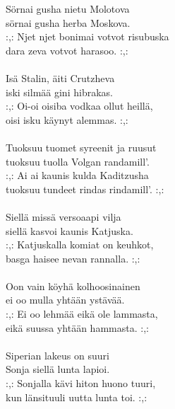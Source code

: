 
            Sörnai gusha nietu Molotova \\
            sörnai gusha herba Moskova. \\
            :,: Njet njet bonimai votvot risubuska \\
            dara zeva votvot harasoo. :,: \\
\hspace{10mm} \\
            Isä Stalin, äiti Crutzheva \\
            iski silmää gini hibrakas. \\
            :,: Oi-oi oisiba vodkaa ollut heillä, \\
            oisi isku käynyt alemmas. :,: \\
\hspace{10mm} \\
            Tuoksuu tuomet syreenit ja ruusut \\
            tuoksuu tuolla Volgan randamill’. \\
            :,: Ai ai kaunis kulda Kaditzusha \\
            tuoksuu tundeet rindas rindamill’. :,: \\
\hspace{10mm} \\
            Siellä missä versoaapi vilja \\
            siellä kasvoi kaunis Katjuska. \\
            :,: Katjuskalla komiat on keuhkot, \\
            basga haisee nevan rannalla. :,: \\
\hspace{10mm} \\
            Oon vain köyhä kolhoosinainen \\
            ei oo mulla yhtään ystävää. \\
            :,: Ei oo lehmää eikä ole lammasta, \\
            eikä suussa yhtään hammasta. :,: \\
\hspace{10mm} \\
            Siperian lakeus on suuri \\
            Sonja siellä lunta lapioi. \\
            :,: Sonjalla kävi hiton huono tuuri, \\
            kun länsituuli uutta lunta toi. :,: \\
